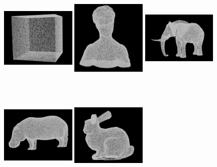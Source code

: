 \begin{figure}[h]
    \centering
    \includegraphics[width=0.32\textwidth, height=5cm]{pcd/cube.png}
    \includegraphics[width=0.32\textwidth, height=5cm]{pcd/woman.png}
    \includegraphics[width=0.32\textwidth, height=5cm]{pcd/elephant.png}
    \includegraphics[width=0.32\textwidth, height=5cm]{pcd/hippo.png}
    \includegraphics[width=0.32\textwidth, height=5cm]{pcd/bunny.png}

\end{figure}

